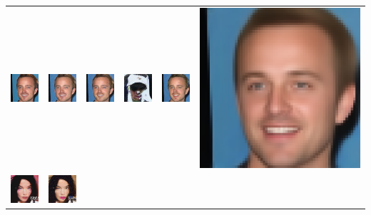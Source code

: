 \begin{table}[h!]
{\begin{tabular}{cccccc}
        \includegraphics[width=.145\textwidth]{chapter4/figures/images/celebA/original/4.png} &   
        \includegraphics[width=.145\textwidth]{chapter4/figures/images/celebA/reconstruction/4.png} &
        \includegraphics[width=.145\textwidth]{chapter4/figures/images/celebA/corrected_reconstruction/4.png} &
        \includegraphics[width=.145\textwidth]{chapter4/figures/images/celebA/diffusion_decoder_beta_0.01/4.png} &
        \includegraphics[width=.145\textwidth]{chapter4/figures/images/celebA/diffusion_decoder_beta_0/4.png} &
        \includegraphics[width=.145\textwidth]{chapter4/figures/images/celebA/VAE_reconstruction/4.png} \\
        \includegraphics[width=.145\textwidth]{chapter4/figures/images/celebA/original/5.png} &   
        \includegraphics[width=.145\textwidth]{chapter4/figures/images/celebA/reconstruction/5.png} &

\end{tabular}}
\end{table}
